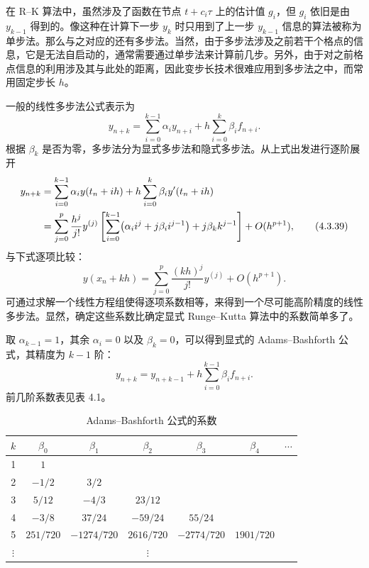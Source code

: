 在 R--K 算法中，虽然涉及了函数在节点 $t+c_i\tau$ 上的估计值 $g_i$，但 $g_i$ 依旧是由 $y_{k-1}$ 得到的。像这种在计算下一步 $y_k$ 时只用到了上一步 $y_{k-1}$ 信息的算法被称为单步法。那么与之对应的还有多步法。当然，由于多步法涉及之前若干个格点的信息，它是无法自启动的，通常需要通过单步法来计算前几步。另外，由于对之前格点信息的利用涉及其与此处的距离，因此变步长技术很难应用到多步法之中，而常用固定步长 $h$。

一般的线性多步法公式表示为
\begin{equation}
 y_{n+k}=\sum_{i=0}^{k-1}\alpha_i y_{n+i}+h\sum_{i=0}^{k}\beta_i f_{n+i}.
\tag{4.3.38}
\end{equation}
根据 $\beta_k$ 是否为零，多步法分为显式多步法和隐式多步法。从上式出发进行逐阶展开
\begin{align}
 y_{n+k}
 &=\sum_{i=0}^{k-1}\alpha_i y(t_n+ih)+h\sum_{i=0}^{k}\beta_i y'(t_n+ih)\notag\\
 &=\sum_{j=0}^{p}\frac{h^j}{j!}y^{(j)}
 \left[\sum_{i=0}^{k-1}\bigl(\alpha_i i^j+j\beta_i i^{j-1}\bigr)+j\beta_k k^{j-1}\right]+O(h^{p+1}),
\tag{4.3.39}
\end{align}
与下式逐项比较：
\begin{equation}
 y(x_n+kh)=\sum_{j=0}^{p}\frac{(kh)^j}{j!}y^{(j)}+O(h^{p+1}).
\tag{4.3.40}
\end{equation}
可通过求解一个线性方程组使得逐项系数相等，来得到一个尽可能高阶精度的线性多步法。显然，确定这些系数比确定显式 Runge--Kutta 算法中的系数简单多了。

取 $\alpha_{k-1}=1$，其余 $\alpha_i=0$ 以及 $\beta_k=0$，可以得到显式的 Adams--Bashforth 公式，其精度为 $k-1$ 阶：
\begin{equation}
 y_{n+k}=y_{n+k-1}+h\sum_{i=0}^{k-1}\beta_i f_{n+i}.
\tag{4.3.41}
\end{equation}
前几阶系数表见表 4.1。

\begin{table}[htbp]
\centering
\caption{Adams--Bashforth 公式的系数}
\begin{tabular}{c c c c c c c}
\toprule
$k$&$\beta_0$&$\beta_1$&$\beta_2$&$\beta_3$&$\beta_4$&$\cdots$\\
\midrule
1&$1$&&&&&\\
2&$-1/2$&$3/2$&&&&\\
3&$5/12$&$-4/3$&$23/12$&&&\\
4&$-3/8$&$37/24$&$-59/24$&$55/24$&&\\
5&$251/720$&$-1274/720$&$2616/720$&$-2774/720$\footnotemark&$1901/720$&\\
$\vdots$&&&$\vdots$&&&\\
\bottomrule
\end{tabular}
\end{table}

